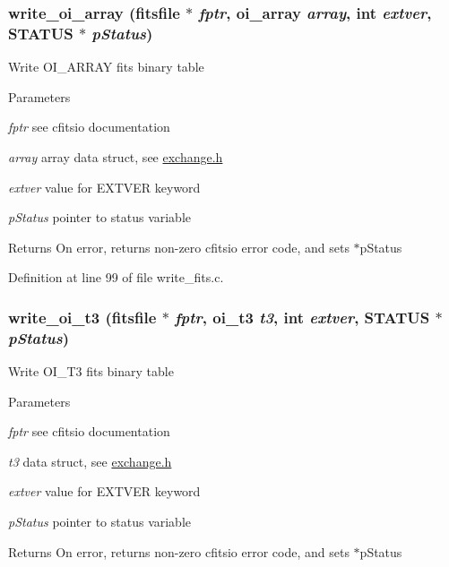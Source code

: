 \label{group__oitable_gabd408e019a9889c75d3791b682ec9a37}
\hypertarget{group__oitable_ga971d883c751f790058b7beaf901bb40f}{
\subsubsection[{write\_\-oi\_\-array}]{ write\_\-oi\_\-array (fitsfile $\ast$ {\em fptr}, \/  {\bf oi\_\-array} {\em array}, \/  int {\em extver}, \/  {\bf STATUS} $\ast$ {\em pStatus})}}
\label{group__oitable_ga971d883c751f790058b7beaf901bb40f}
Write OI\_\-ARRAY fits binary table


\begin{DoxyParams}{Parameters}
\item[{\em fptr}]see cfitsio documentation \item[{\em array}]array data struct, see \hyperlink{exchange_8h}{exchange.h} \item[{\em extver}]value for EXTVER keyword \item[{\em pStatus}]pointer to status variable\end{DoxyParams}
\begin{DoxyReturn}{Returns}
On error, returns non-\/zero cfitsio error code, and sets $\ast$pStatus 
\end{DoxyReturn}


Definition at line 99 of file write\_\-fits.c.

\hypertarget{group__oitable_gadd1d53e7ff4d0b5b64ffbd2b364ca31a}{
\subsubsection[{write\_\-oi\_\-t3}]{ write\_\-oi\_\-t3 (fitsfile $\ast$ {\em fptr}, \/  {\bf oi\_\-t3} {\em t3}, \/  int {\em extver}, \/  {\bf STATUS} $\ast$ {\em pStatus})}}
\label{group__oitable_gadd1d53e7ff4d0b5b64ffbd2b364ca31a}
Write OI\_\-T3 fits binary table


\begin{DoxyParams}{Parameters}
\item[{\em fptr}]see cfitsio documentation \item[{\em t3}]data struct, see \hyperlink{exchange_8h}{exchange.h} \item[{\em extver}]value for EXTVER keyword \item[{\em pStatus}]pointer to status variable\end{DoxyParams}
\begin{DoxyReturn}{Returns}
On error, returns non-\/zero cfitsio error code, and sets $\ast$pStatus 
\end{DoxyReturn}


